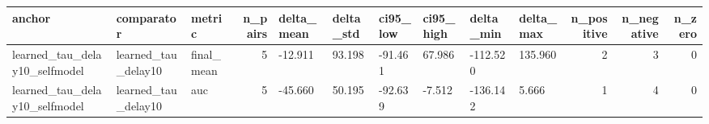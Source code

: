 \begin{tabular}{lllrllllllrrr}
\toprule
anchor & comparator & metric & n_pairs & delta_mean & delta_std & ci95_low & ci95_high & delta_min & delta_max & n_positive & n_negative & n_zero \\
\midrule
learned_tau_delay10_selfmodel & learned_tau_delay10 & final_mean & 5 & -12.911 & 93.198 & -91.461 & 67.986 & -112.520 & 135.960 & 2 & 3 & 0 \\
learned_tau_delay10_selfmodel & learned_tau_delay10 & auc & 5 & -45.660 & 50.195 & -92.639 & -7.512 & -136.142 & 5.666 & 1 & 4 & 0 \\
\bottomrule
\end{tabular}
